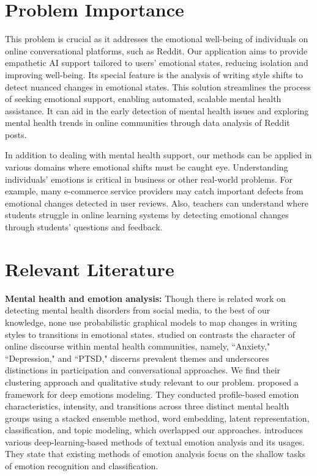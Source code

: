 \documentclass[conference,compsoc]{IEEEtran}
\begin{document}
\section{Problem Importance}
This problem is crucial as it addresses the emotional well-being of individuals on online conversational platforms, such as Reddit. Our application aims to provide empathetic AI support tailored to users' emotional states, reducing isolation and improving well-being. Its special feature is the analysis of writing style shifts to detect nuanced changes in emotional states. This solution streamlines the process of seeking emotional support, enabling automated, scalable mental health assistance. It can aid in the early detection of mental health issues and exploring mental health trends in online communities through data analysis of Reddit posts. 

In addition to dealing with mental health support, our methods can be applied in various domains where emotional shifts must be caught eye. Understanding individuals' emotions is critical in business or other real-world problems. For example, many e-commerce service providers may catch important defects from emotional changes detected in user reviews. Also, teachers can understand where students struggle in online learning systems by detecting emotional changes through students' questions and feedback.

\section{Relevant Literature}
\textbf{Mental health and emotion analysis: }Though there is related work on detecting mental health disorders from social media, to the best of our knowledge, none use probabilistic graphical models to map changes in writing styles to transitions in emotional states. \citet{Park+18:mental-health-reddit} studied on contrasts the character of online discourse within mental health communities, namely, ``Anxiety," ``Depression," and ``PTSD," discerns prevalent themes and underscores distinctions in participation and conversational approaches. We find their clustering approach and qualitative study relevant to our problem. \citet{Achini+21:emotion-analysis} proposed a framework for deep emotions modeling. They conducted profile-based emotion characteristics, intensity, and transitions across three distinct mental health groups using a stacked ensemble method, word embedding, latent representation, classification, and topic modeling, which overlapped our approaches. \citet{Peng+22:emotion-analysis-survey} introduces various deep-learning-based methods of textual emotion analysis and its usages. They state that existing methods of emotion analysis focus on the shallow tasks of emotion recognition and classification. 
\end{document}
